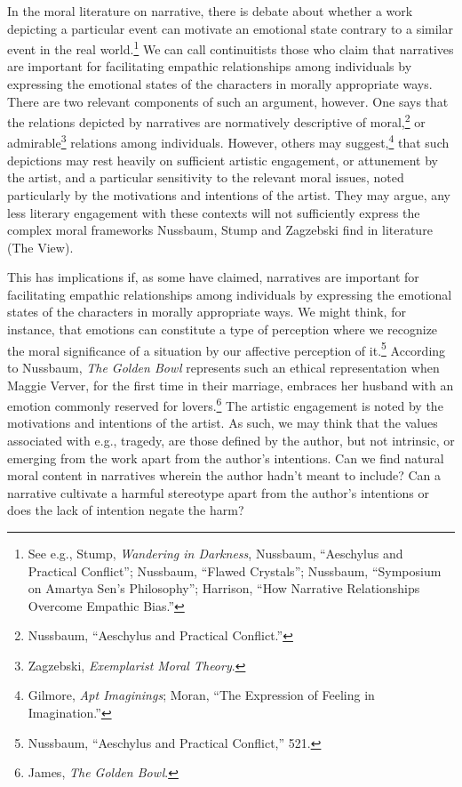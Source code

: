 \documentclass[
  12pt,
]{book}
\theoremstyle{definition}
\theoremstyle{definition}
\theoremstyle{definition}
\theoremstyle{definition}
\theoremstyle{remark}
\begin{document}
In the moral literature on narrative, there is debate about whether a work depicting a particular event can motivate an emotional state contrary to a similar event in the real world.\footnote{See e.g., Stump, \emph{Wandering in {Darkness}}, Nussbaum, {``Aeschylus and Practical Conflict''}; Nussbaum, {``Flawed {Crystals}''}; Nussbaum, {``Symposium on {Amartya Sen}'s Philosophy''}; Harrison, {``How {Narrative Relationships Overcome Empathic Bias}.''}} We can call continuitists those who claim that narratives are important for facilitating empathic relationships among individuals by expressing the emotional states of the characters in morally appropriate ways. There are two relevant components of such an argument, however. One says that the relations depicted by narratives are normatively descriptive of moral,\footnote{Nussbaum, {``Aeschylus and Practical Conflict.''}} or admirable\footnote{Zagzebski, \emph{Exemplarist {Moral Theory}}.} relations among individuals. However, others may suggest,\footnote{Gilmore, \emph{Apt {Imaginings}}; Moran, {``The {Expression} of {Feeling} in {Imagination}.''}} that such depictions may rest heavily on sufficient artistic engagement, or attunement by the artist, and a particular sensitivity to the relevant moral issues, noted particularly by the motivations and intentions of the artist. They may argue, any less literary engagement with these contexts will not sufficiently express the complex moral frameworks Nussbaum, Stump and Zagzebski find in literature (The View).

This has implications if, as some have claimed, narratives are important for facilitating empathic relationships among individuals by expressing the emotional states of the characters in morally appropriate ways. We might think, for instance, that emotions can constitute a type of perception where we recognize the moral significance of a situation by our affective perception of it.\footnote{Nussbaum, {``Aeschylus and Practical Conflict,''} 521.} According to Nussbaum, \emph{The Golden Bowl} represents such an ethical representation when Maggie Verver, for the first time in their marriage, embraces her husband with an emotion commonly reserved for lovers.\footnote{James, \emph{The Golden Bowl}.} The artistic engagement is noted by the motivations and intentions of the artist. As such, we may think that the values associated with e.g., tragedy, are those defined by the author, but not intrinsic, or emerging from the work apart from the author's intentions. Can we find natural moral content in narratives wherein the author hadn't meant to include? Can a narrative cultivate a harmful stereotype apart from the author's intentions or does the lack of intention negate the harm?
\end{document}
